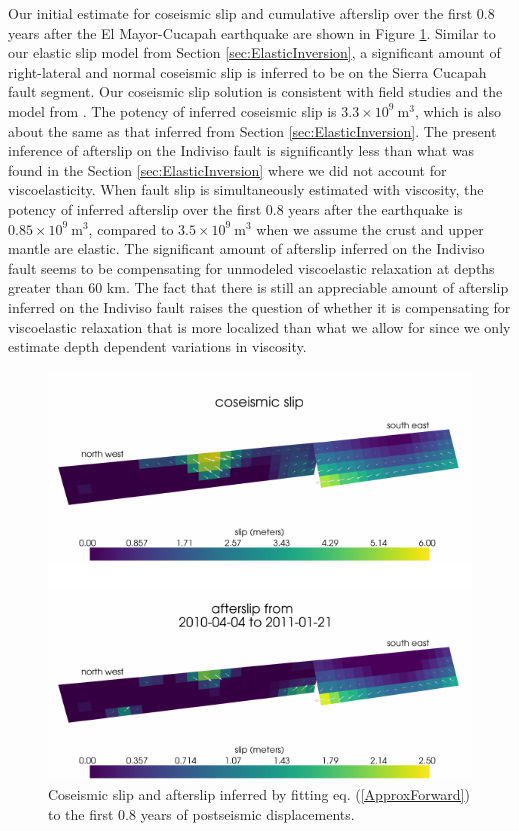 \documentclass[draft,linenumbers]{AGUJournal}
\begin{document}
Our initial estimate for coseismic slip and cumulative afterslip over the first 0.8 years after the El Mayor-Cucapah earthquake are shown in Figure \ref{fig:InitialSlip}.  Similar to our elastic slip model from Section \ref{sec:ElasticInversion}, a significant amount of right-lateral and normal coseismic slip is inferred to be on the Sierra Cucapah fault segment. Our coseismic slip solution is consistent with field studies \citep{Fletcher2014} and the model from \citet{Wei2011}.  The potency of inferred coseismic slip is $3.3\times 10^{9}\ \mathrm{m}^3$, which is also about the same as that inferred from Section \ref{sec:ElasticInversion}. The present inference of afterslip on the Indiviso fault is significantly less than what was found in the Section \ref{sec:ElasticInversion} where we did not account for viscoelasticity. When fault slip is simultaneously estimated with viscosity, the potency of inferred afterslip over the first 0.8 years after the earthquake is $0.85\times 10^9\ \mathrm{m}^3$, compared to $3.5\times10^{9}\ \mathrm{m}^3$ when we assume the crust and upper mantle are elastic.  The significant amount of afterslip inferred on the Indiviso fault seems to be compensating for unmodeled viscoelastic relaxation at depths greater than $60$ km.  The fact that there is still an appreciable amount of afterslip inferred on the Indiviso fault raises the question of whether it is compensating for viscoelastic relaxation that is more localized than what we allow for since we only estimate depth dependent variations in viscosity.  

\begin{figure}
\includegraphics[scale=0.8]{Figures/InitialSlip}
\caption{Coseismic slip and afterslip inferred by fitting eq. (\ref{ApproxForward}) to the first 0.8 years of postseismic displacements.}
\label{fig:InitialSlip}
\end{figure} 
\end{document}
